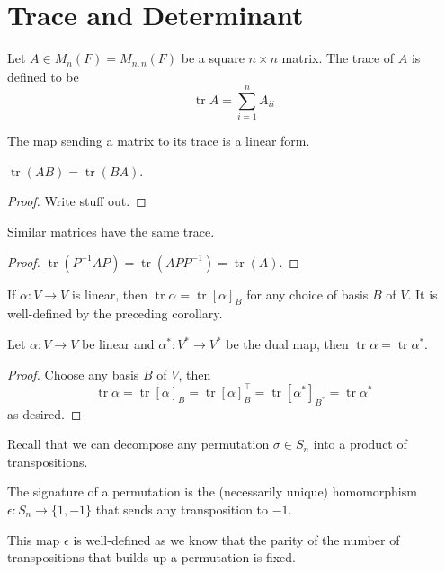 \section{Trace and Determinant}
\begin{definition}
    Let $A\in M_n(F)=M_{n,n}(F)$ be a square $n\times n$ matrix.
    The trace of $A$ is defined to be
    $$\operatorname{tr}A=\sum_{i=1}^nA_{ii}$$
\end{definition}
\begin{remark}
    The map sending a matrix to its trace is a linear form.
\end{remark}
\begin{lemma}
    $\operatorname{tr}(AB)=\operatorname{tr}(BA)$.
\end{lemma}
\begin{proof}
    Write stuff out.
\end{proof}
\begin{corollary}
    Similar matrices have the same trace.
\end{corollary}
\begin{proof}
    $\operatorname{tr}(P^{-1}AP)=\operatorname{tr}(APP^{-1})=\operatorname{tr}(A)$.
\end{proof}
\begin{definition}
    If $\alpha:V\to V$ is linear, then $\operatorname{tr}\alpha=\operatorname{tr}[\alpha]_B$ for any choice of basis $B$ of $V$.
    It is well-defined by the preceding corollary.
\end{definition}
\begin{lemma}
    Let $\alpha:V\to V$ be linear and $\alpha^\ast:V^\ast\to V^\ast$ be the dual map, then $\operatorname{tr}\alpha=\operatorname{tr}\alpha^\ast$.
\end{lemma}
\begin{proof}
    Choose any basis $B$ of $V$, then
    $$\operatorname{tr}\alpha=\operatorname{tr}[\alpha]_B=\operatorname{tr}[\alpha]_B^\top=\operatorname{tr}[\alpha^\ast]_{B^\ast}=\operatorname{tr}\alpha^\ast$$
    as desired.
\end{proof}
Recall that we can decompose any permutation $\sigma\in S_n$ into a product of transpositions.
\begin{definition}
    The signature of a permutation is the (necessarily unique) homomorphism $\epsilon:S_n\to\{1,-1\}$ that sends any transposition to $-1$.
\end{definition}
This map $\epsilon$ is well-defined as we know that the parity of the number of transpositions that builds up a permutation is fixed.
